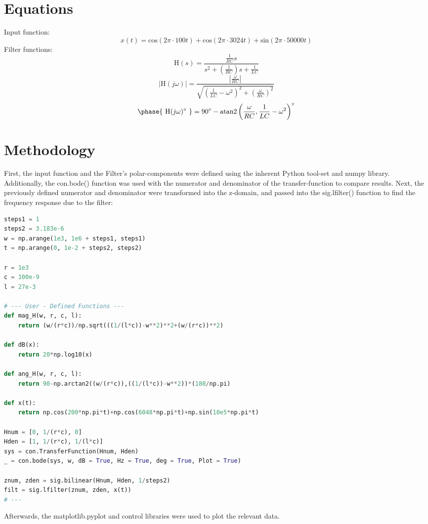 \documentclass[12pt]{report}
\begin{document}
\section{Equations}
Input function:
\begin{equation}
    x(t) = \text{cos}(2\pi \cdot 100t)+\text{cos}(2\pi \cdot 3024t)+\text{sin}(2\pi \cdot 50000t)
\end{equation}
Filter functions:
\begin{equation}
    \text{H}(s) = \frac{\frac{1}{RC}s}{s^{2}+(\frac{1}{RC})s+\frac{1}{LC}}
\end{equation}
\begin{equation}
    |\text{H}(j\omega)| = \frac{|\frac{\omega}{RC}|}{\sqrt{(\frac{1}{LC}-\omega^{2})^{2}+(\frac{\omega}{RC})^{2}}}
\end{equation}
\begin{equation}
    \phase{\text{ H}(j\omega)^{\circ}\text{ }} = 90^{\circ} - \text{atan2}\left(\frac{\omega}{RC},\frac{1}{LC}-\omega^{2}\right) ^{\circ}
\end{equation}

\pagebreak

\section{Methodology}
First, the input function and the Filter's polar-components were defined using the inherent Python tool-set and numpy library. Additionally, the con.bode() function was used with the numerator and denominator of the transfer-function to compare results. Next, the previously defined numerator and denominator were transformed into the z-domain, and passed into the sig.lfilter() function to find the frequency response due to the filter:

\begin{lstlisting}[language=Python]
steps1 = 1
steps2 = 3.183e-6
w = np.arange(1e3, 1e6 + steps1, steps1)
t = np.arange(0, 1e-2 + steps2, steps2)

r = 1e3
c = 100e-9
l = 27e-3

# --- User - Defined Functions ---
def mag_H(w, r, c, l):
    return (w/(r*c))/np.sqrt(((1/(l*c))-w**2)**2+(w/(r*c))**2)

def dB(x):
    return 20*np.log10(x)

def ang_H(w, r, c, l):
    return 90-np.arctan2((w/(r*c)),((1/(l*c))-w**2))*(180/np.pi)

def x(t):
    return np.cos(200*np.pi*t)+np.cos(6048*np.pi*t)+np.sin(10e5*np.pi*t)

Hnum = [0, 1/(r*c), 0]
Hden = [1, 1/(r*c), 1/(l*c)]
sys = con.TransferFunction(Hnum, Hden)
_ = con.bode(sys, w, dB = True, Hz = True, deg = True, Plot = True)

znum, zden = sig.bilinear(Hnum, Hden, 1/steps2)
filt = sig.lfilter(znum, zden, x(t))
# ---
\end{lstlisting}
Afterwards, the matplotlib.pyplot and control libraries were used to plot the relevant data. \pagebreak
\end{document}
